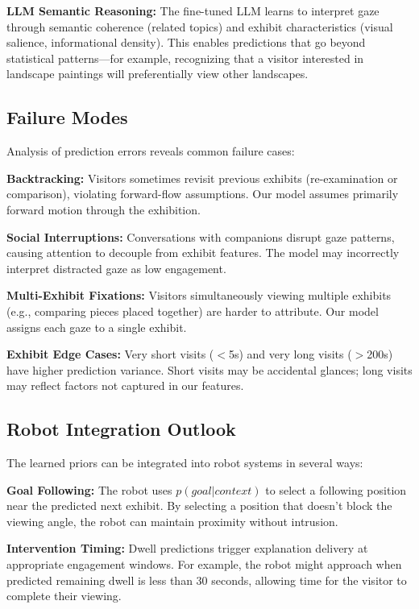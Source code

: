 \documentclass[letterpaper]{article}
\begin{document}
\textbf{LLM Semantic Reasoning:} The fine-tuned LLM learns to interpret gaze through semantic coherence (related topics) and exhibit characteristics (visual salience, informational density). This enables predictions that go beyond statistical patterns—for example, recognizing that a visitor interested in landscape paintings will preferentially view other landscapes.

\subsection{Failure Modes}

Analysis of prediction errors reveals common failure cases:

\textbf{Backtracking:} Visitors sometimes revisit previous exhibits (re-examination or comparison), violating forward-flow assumptions. Our model assumes primarily forward motion through the exhibition.

\textbf{Social Interruptions:} Conversations with companions disrupt gaze patterns, causing attention to decouple from exhibit features. The model may incorrectly interpret distracted gaze as low engagement.

\textbf{Multi-Exhibit Fixations:} Visitors simultaneously viewing multiple exhibits (e.g., comparing pieces placed together) are harder to attribute. Our model assigns each gaze to a single exhibit.

\textbf{Exhibit Edge Cases:} Very short visits ($<$5s) and very long visits ($>$200s) have higher prediction variance. Short visits may be accidental glances; long visits may reflect factors not captured in our features.

\subsection{Robot Integration Outlook}

The learned priors can be integrated into robot systems in several ways:

\textbf{Goal Following:} The robot uses $p(goal|context)$ to select a following position near the predicted next exhibit. By selecting a position that doesn't block the viewing angle, the robot can maintain proximity without intrusion.

\textbf{Intervention Timing:} Dwell predictions trigger explanation delivery at appropriate engagement windows. For example, the robot might approach when predicted remaining dwell is less than 30 seconds, allowing time for the visitor to complete their viewing.
\end{document}
